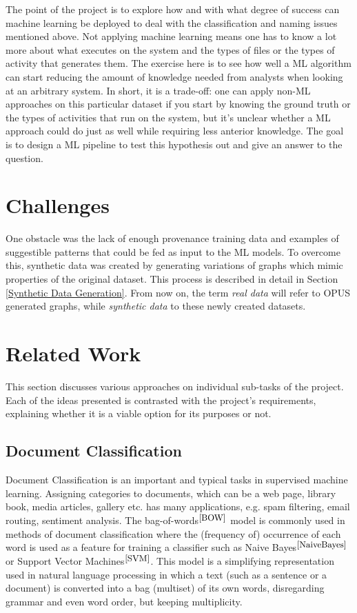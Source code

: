 The point of the project is to explore how and with what degree of success can machine learning be deployed to deal with the classification and naming issues mentioned above. Not applying machine learning means one has to know a lot more about what executes on the system and the types of files or the types of activity that generates them. The exercise here is to see how well a ML algorithm can start reducing the amount of knowledge needed from analysts when looking at an arbitrary system. In short, it is a trade-off: one can apply non-ML approaches on this particular dataset if you start by knowing the ground truth or the types of activities that run on the system, but it's unclear whether a ML approach could do just as well while requiring less anterior knowledge. The goal is to design a ML pipeline to test this hypothesis out and give an answer to the question. 

\section{Challenges}

One obstacle was the lack of enough provenance training data and examples of suggestible patterns that could be fed as input to the ML models. To overcome this, synthetic data was created by generating variations of graphs which mimic properties of the original dataset. This process is described in detail in Section \ref{Synthetic Data Generation}.
From now on, the term \textit{real data} will refer to OPUS generated graphs, while \textit{synthetic data} to these newly created datasets. 

\section{Related Work}

This section discusses various approaches on individual sub-tasks of the project. Each of the ideas presented is contrasted with the project's requirements, explaining whether it is a viable option for its purposes or not. 

\subsection{Document Classification}

Document Classification is an important and typical tasks in supervised machine learning. Assigning categories to documents, which can be a web page, library book, media articles, gallery etc. has many applications, e.g. spam filtering, email routing, sentiment analysis. The bag-of-words$^{\small \cite{BOW}}$ model is commonly used in methods of document classification where the (frequency of) occurrence of each word is used as a feature for training a classifier such as Naive Bayes$^{\small \cite{NaiveBayes}}$ or Support Vector Machines$^{\small \cite{SVM}}$. This model is a simplifying representation used in natural language processing in which a text (such as a sentence or a document) is converted into a bag (multiset) of its own words, disregarding grammar and even word order, but keeping multiplicity. \\

